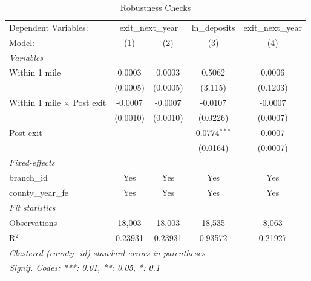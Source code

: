 
\begin{table}[htbp]
   \caption{Robustness Checks}
   \label{tab:robustness}
   \centering
   \begin{tabular}{lcccc}
      \tabularnewline \midrule \midrule
      Dependent Variables: & \multicolumn{2}{c}{exit\_next\_year} & ln\_deposits & exit\_next\_year\\
      Model:                            & (1)      & (2)      & (3)            & (4)\\  
      \midrule
      \emph{Variables}\\
      Within 1 mile                     & 0.0003   & 0.0003   & 0.5062         & 0.0006\\   
                                        & (0.0005) & (0.0005) & (3.115)        & (0.1203)\\   
      Within 1 mile $\times$ Post exit  & -0.0007  & -0.0007  & -0.0107        & -0.0007\\   
                                        & (0.0010) & (0.0010) & (0.0226)       & (0.0007)\\   
      Post exit                         &          &          & 0.0774$^{***}$ & 0.0007\\   
                                        &          &          & (0.0164)       & (0.0007)\\   
      \midrule
      \emph{Fixed-effects}\\
      branch\_id                        & Yes      & Yes      & Yes            & Yes\\  
      county\_year\_fe                  & Yes      & Yes      & Yes            & Yes\\  
      \midrule
      \emph{Fit statistics}\\
      Observations                      & 18,003   & 18,003   & 18,535         & 8,063\\  
      R$^2$                             & 0.23931  & 0.23931  & 0.93572        & 0.21927\\  
      \midrule \midrule
      \multicolumn{5}{l}{\emph{Clustered (county\_id) standard-errors in parentheses}}\\
      \multicolumn{5}{l}{\emph{Signif. Codes: ***: 0.01, **: 0.05, *: 0.1}}\\
   \end{tabular}
\end{table}


